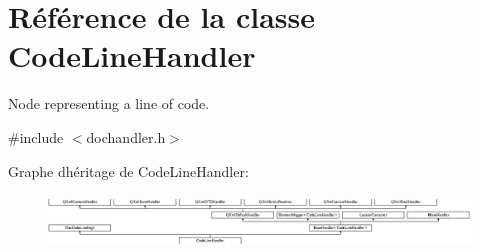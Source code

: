 \hypertarget{class_code_line_handler}{}\section{Référence de la classe Code\+Line\+Handler}
\label{class_code_line_handler}


Node representing a line of code.  




{\ttfamily \#include $<$dochandler.\+h$>$}

Graphe d\textquotesingle{}héritage de Code\+Line\+Handler\+:\begin{figure}[H]
\begin{center}
\leavevmode
\includegraphics[height=1.385281cm]{class_code_line_handler}
\end{center}
\end{figure}
